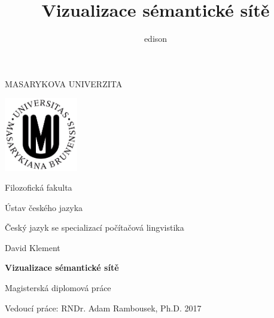 \documentclass[a4paper, 11pt, oneside, showtrims]{book}
\author{edison}
\title{Vizualizace sémantické sítě}
\begin{document}
	
	
	\begin{titlepage}
		\begin{center}
			{\Large\uppercase{Masarykova univerzita}}

			\vspace{1em}

			\includegraphics[width=0.24\textwidth]{logo-muni.png}
			
			\vspace{2em}

			{\Large Filozofická fakulta}

			\vspace{1em}

			{\large Ústav českého jazyka}

			\vspace{1em}

			{\large Český jazyk se specializací počítačová lingvistika}

			\vspace{7em}

			{\Large David Klement}
			
			\vspace{5em}
			
			{\huge\bf Vizualizace sémantické sítě}

			\vspace{1.5em}

			{\Large Magisterská diplomová práce}

			\vfill
		\end{center}
		\begin{flushleft}
			Vedoucí práce: RNDr. Adam Rambousek, Ph.D. \hfill 2017
		\end{flushleft}
	\end{titlepage}

	\newpage

	{
		\tableofcontents

		\adjustmtc %
		\adjustmtc %
	}

\end{document}
